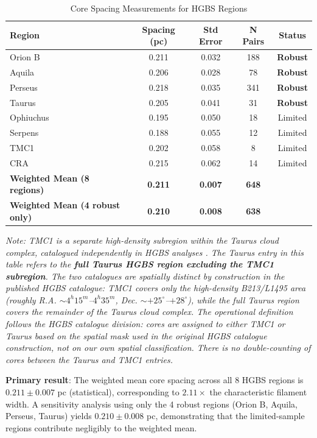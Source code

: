 \documentclass[11pt,a4paper]{article}
\begin{document}
\begin{table}[H]
\centering
\caption{Core Spacing Measurements for HGBS Regions}
\label{tab:all_regions}
\begin{tabular}{lcccc}
\toprule
Region & Spacing (pc) & Std Error & N Pairs & Status \\
\midrule
Orion B  & 0.211 & 0.032 & 188 & \textbf{Robust} \\
Aquila   & 0.206 & 0.028 & 78  & \textbf{Robust} \\
Perseus  & 0.218 & 0.035 & 341 & \textbf{Robust} \\
Taurus   & 0.205 & 0.041 & 31  & \textbf{Robust} \\
\midrule
Ophiuchus& 0.195 & 0.050 & 18  & Limited \\
Serpens  & 0.188 & 0.055 & 12  & Limited \\
TMC1     & 0.202 & 0.058 & 8   & Limited \\
CRA      & 0.215 & 0.062 & 14  & Limited \\
\midrule
\textbf{Weighted Mean (8 regions)} & \textbf{0.211} & \textbf{0.007} & \textbf{648} & \\
\textbf{Weighted Mean (4 robust only)} & \textbf{0.210} & \textbf{0.008} & \textbf{638} & \\
\bottomrule
\end{tabular}
\vspace{-0.5em}
\small{\textit{Note: TMC1 is a separate high-density subregion within the Taurus cloud complex, catalogued independently in HGBS analyses \citep{Konyves2015}. The Taurus entry in this table refers to the \textbf{full Taurus HGBS region excluding the TMC1 subregion}. The two catalogues are spatially distinct by construction in the published HGBS catalogue: TMC1 covers only the high-density B213/L1495 area (roughly R.A. $\sim 4^h 15^m$--$4^h 35^m$, Dec. $\sim +25^\circ$--$+28^\circ$), while the full Taurus region covers the remainder of the Taurus cloud complex. The operational definition follows the HGBS catalogue division: cores are assigned to either TMC1 or Taurus based on the spatial mask used in the original HGBS catalogue construction, not on our own spatial classification. There is no double-counting of cores between the Taurus and TMC1 entries.}}
\end{table}

\noindent\textbf{Primary result}: The weighted mean core spacing across all 8 HGBS regions is $0.211 \pm 0.007$ pc (statistical), corresponding to $2.11\times$ the characteristic filament width. A sensitivity analysis using only the 4 robust regions (Orion B, Aquila, Perseus, Taurus) yields $0.210 \pm 0.008$ pc, demonstrating that the limited-sample regions contribute negligibly to the weighted mean.
\end{document}
